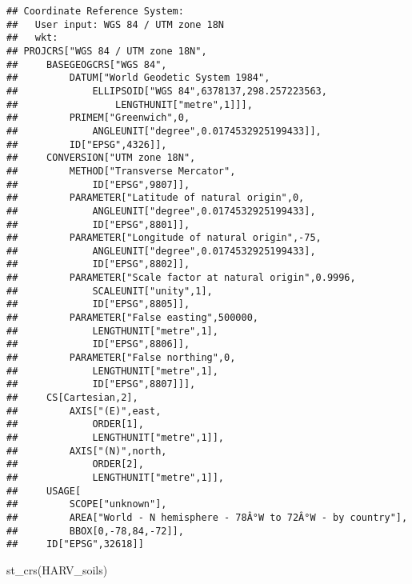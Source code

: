 \documentclass[
]{book}
\newenvironment{Shaded}{\begin{snugshade}}{\end{snugshade}}
\newcommand{\FunctionTok}[1]{\textcolor[rgb]{0.00,0.00,0.00}{#1}}
\newcommand{\NormalTok}[1]{#1}
\begin{document}
\begin{verbatim}
## Coordinate Reference System:
##   User input: WGS 84 / UTM zone 18N 
##   wkt:
## PROJCRS["WGS 84 / UTM zone 18N",
##     BASEGEOGCRS["WGS 84",
##         DATUM["World Geodetic System 1984",
##             ELLIPSOID["WGS 84",6378137,298.257223563,
##                 LENGTHUNIT["metre",1]]],
##         PRIMEM["Greenwich",0,
##             ANGLEUNIT["degree",0.0174532925199433]],
##         ID["EPSG",4326]],
##     CONVERSION["UTM zone 18N",
##         METHOD["Transverse Mercator",
##             ID["EPSG",9807]],
##         PARAMETER["Latitude of natural origin",0,
##             ANGLEUNIT["degree",0.0174532925199433],
##             ID["EPSG",8801]],
##         PARAMETER["Longitude of natural origin",-75,
##             ANGLEUNIT["degree",0.0174532925199433],
##             ID["EPSG",8802]],
##         PARAMETER["Scale factor at natural origin",0.9996,
##             SCALEUNIT["unity",1],
##             ID["EPSG",8805]],
##         PARAMETER["False easting",500000,
##             LENGTHUNIT["metre",1],
##             ID["EPSG",8806]],
##         PARAMETER["False northing",0,
##             LENGTHUNIT["metre",1],
##             ID["EPSG",8807]]],
##     CS[Cartesian,2],
##         AXIS["(E)",east,
##             ORDER[1],
##             LENGTHUNIT["metre",1]],
##         AXIS["(N)",north,
##             ORDER[2],
##             LENGTHUNIT["metre",1]],
##     USAGE[
##         SCOPE["unknown"],
##         AREA["World - N hemisphere - 78Â°W to 72Â°W - by country"],
##         BBOX[0,-78,84,-72]],
##     ID["EPSG",32618]]
\end{verbatim}

\begin{Shaded}
\begin{Highlighting}[]
\FunctionTok{st\_crs}\NormalTok{(HARV\_soils)}
\end{Highlighting}
\end{Shaded}
\end{document}
